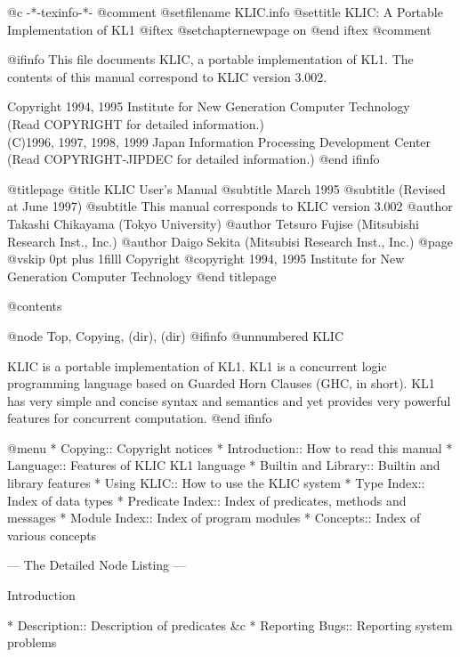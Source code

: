  @c -*-texinfo-*-
@comment %
@setfilename KLIC.info
@settitle KLIC: A Portable Implementation of KL1
@iftex
@setchapternewpage on
@end iftex
@comment %

@ifinfo
This file documents KLIC, a portable implementation of KL1.
The contents of this manual correspond to KLIC version 3.002.

Copyright 1994, 1995 Institute for New Generation Computer Technology\\
(Read COPYRIGHT for detailed information.)\\
(C)1996, 1997, 1998, 1999 Japan Information Processing Development Center\\
(Read COPYRIGHT-JIPDEC for detailed information.)
@end ifinfo

@titlepage
@title KLIC User's Manual
@subtitle March 1995
@subtitle (Revised at June 1997)
@subtitle This manual corresponds to KLIC version 3.002
@author Takashi Chikayama (Tokyo University)
@author Tetsuro Fujise (Mitsubishi Research Inst., Inc.)
@author Daigo Sekita (Mitsubisi Research Inst., Inc.)
@page
@vskip 0pt plus 1filll
Copyright @copyright{} 1994, 1995 Institute for New Generation Computer Technology
@end titlepage

@contents

@node Top, Copying, (dir), (dir)
@ifinfo
@unnumbered KLIC

KLIC is a portable implementation of KL1.  KL1 is a concurrent logic
programming language based on Guarded Horn Clauses (GHC, in short).
KL1 has very simple and concise syntax and semantics and yet provides
very powerful features for concurrent computation.
@end ifinfo

@menu
* Copying::                     Copyright notices
* Introduction::                How to read this manual
* Language::                    Features of KLIC KL1 language
* Builtin and Library::         Builtin and library features
* Using KLIC::                  How to use the KLIC system
* Type Index::                  Index of data types
* Predicate Index::             Index of predicates, methods and messages
* Module Index::                Index of program modules
* Concepts::                    Index of various concepts

 --- The Detailed Node Listing ---

Introduction

* Description::                 Description of predicates &c
* Reporting Bugs::              Reporting system problems

